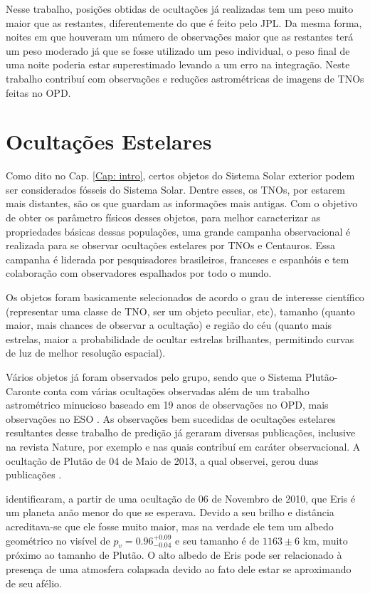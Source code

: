 \documentclass[12pt,a4paper]{monografia}
\begin{document}
Nesse trabalho, posições obtidas de ocultações já realizadas tem um peso muito maior que as restantes, diferentemente do que é feito pelo JPL. Da mesma forma, noites em que houveram um número de observações maior que as restantes terá um peso moderado já que se fosse utilizado um peso individual, o peso final de uma noite poderia estar superestimado levando a um erro na integração. Neste trabalho contribuí com observações e reduções astrométricas de imagens de TNOs feitas no OPD.

\section{Ocultações Estelares}
\label{Sec: TNO-occ}

\indent \indent Como dito no Cap. \ref{Cap: intro}, certos objetos do Sistema Solar exterior podem ser considerados fósseis do Sistema Solar. Dentre esses, os TNOs, por estarem mais distantes, são os que guardam as informações mais antigas. Com o objetivo de obter os parâmetro físicos desses objetos, para melhor caracterizar as propriedades básicas dessas populações, uma grande campanha observacional é realizada para se observar ocultações estelares por TNOs e Centauros. Essa campanha é liderada por pesquisadores brasileiros, franceses e espanhóis e tem colaboração com observadores espalhados por todo o mundo.

Os objetos foram basicamente selecionados de acordo o grau de interesse científico (representar uma classe de TNO, ser um  objeto peculiar, etc), tamanho (quanto maior, mais chances de observar a ocultação) e região do céu (quanto mais estrelas, maior  a probabilidade de ocultar estrelas brilhantes, permitindo curvas de luz de melhor resolução espacial).

Vários objetos já foram observados pelo grupo, sendo que o Sistema Plutão-Caronte conta com várias ocultações observadas além de um trabalho astrométrico minucioso baseado em 19 anos de observações no OPD, mais observações no ESO \citep{Rossi2014}. As observações bem sucedidas de ocultações estelares resultantes desse trabalho de predição já geraram diversas publicações, inclusive na revista Nature, por exemplo \cite{Sicardy2011} e \cite{BragaRibas2014} nas quais contribuí em caráter observacional. A ocultação de Plutão de 04 de Maio de 2013, a qual observei, gerou duas publicações \citep{Olkin2015, DiasOliveira2015}.

\cite{Sicardy2011} identificaram, a partir de uma ocultação de 06 de Novembro de 2010, que Eris é um planeta anão menor do que se esperava. Devido a seu brilho e distância acreditava-se que ele fosse muito maior, mas na verdade ele tem um albedo geométrico no visível de $p_v=0.96^{+0.09}_{-0.04}$ e seu tamanho é de $1163 \pm 6$ km, muito próximo ao tamanho de Plutão. O alto albedo de Eris pode ser relacionado à presença de uma atmosfera colapsada devido ao fato dele estar se aproximando de seu afélio.
\end{document}
